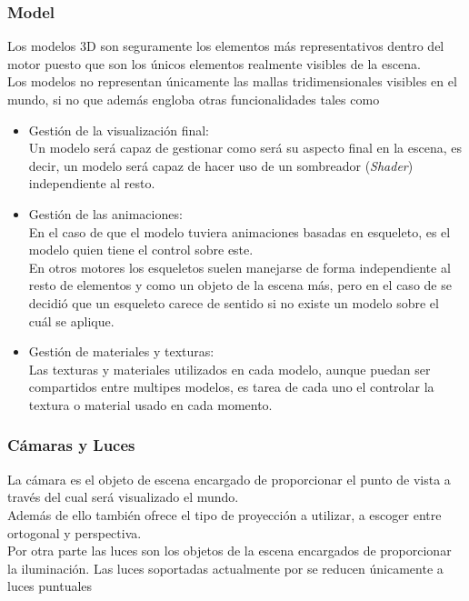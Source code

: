 \subsubsection{Model}
Los modelos 3D son seguramente los elementos más representativos dentro del motor puesto que son los únicos elementos realmente visibles de la escena.\\
Los modelos no representan únicamente las mallas tridimensionales visibles en el mundo, si no que además engloba otras funcionalidades tales como

\begin{itemize}
\item Gestión de la visualización final:\\
Un modelo será capaz de gestionar como será su aspecto final en la escena, es decir, un modelo será capaz de hacer uso de un sombreador (\textit{Shader}) independiente al resto.
\item Gestión de las animaciones:\\
En el caso de que el modelo tuviera animaciones basadas en esqueleto, es el modelo quien tiene el control sobre este.\\
En otros motores los esqueletos suelen manejarse de forma independiente al resto de elementos y como un objeto de la escena más, pero en el caso de \robotto se decidió que un esqueleto carece de sentido si no existe un modelo sobre el cuál se aplique.
\item Gestión de materiales y texturas:\\
Las texturas y materiales utilizados en cada modelo, aunque puedan ser compartidos entre multipes modelos, es tarea de cada uno el controlar la textura o material usado en cada momento.
\end{itemize}

\subsubsection{Cámaras y Luces}
La cámara es el objeto de escena encargado de proporcionar el punto de vista a través del cual será visualizado el mundo.\\
Además de ello también ofrece el tipo de proyección a utilizar, a escoger entre ortogonal y perspectiva.\\

Por otra parte las luces son los objetos de la escena encargados de proporcionar la iluminación. Las luces soportadas actualmente por \robotto se reducen únicamente a luces puntuales\\

